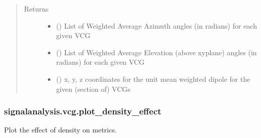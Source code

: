 \documentclass[letterpaper,10pt,english]{sphinxmanual}
\begin{document}
\begin{fulllineitems}
\begin{quote}
\begin{description}
\begin{itemize}
\end{itemize}

\item[{Returns}] \leavevmode
\sphinxAtStartPar
\begin{itemize}
\item {} 
\sphinxAtStartPar
{} () \textendash{} List of Weighted Average Azimuth angles (in radians) for each given VCG

\item {} 
\sphinxAtStartPar
{} () \textendash{} List of Weighted Average Elevation (above xy\sphinxhyphen{}plane) angles (in radians) for each given VCG

\item {} 
\sphinxAtStartPar
{} () \textendash{} x, y, z coordinates for the unit mean weighted dipole for the given (section of) VCGs

\end{itemize}


\end{description}\end{quote}

\end{fulllineitems}



\subsubsection{signalanalysis.vcg.plot\_density\_effect}
\label{\detokenize{_autosummary/signalanalysis.vcg.plot_density_effect:signalanalysis-vcg-plot-density-effect}}\label{\detokenize{_autosummary/signalanalysis.vcg.plot_density_effect::doc}}

\begin{fulllineitems}
\label{\detokenize{_autosummary/signalanalysis.vcg.plot_density_effect:signalanalysis.vcg.plot_density_effect}}
\sphinxAtStartPar
Plot the effect of density on metrics.

\end{fulllineitems}
\end{document}
